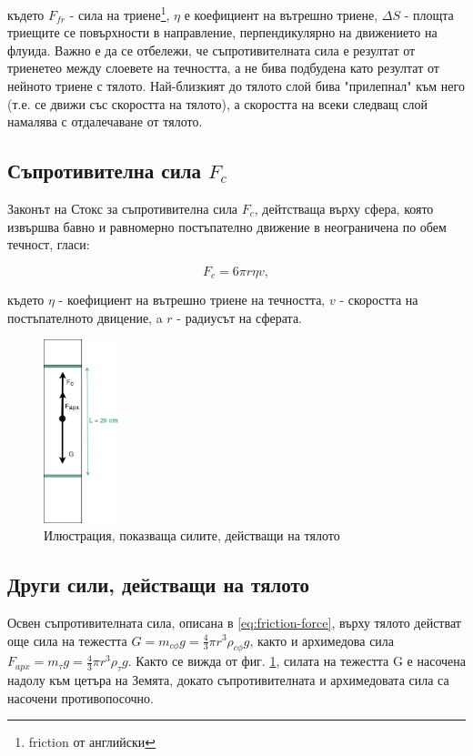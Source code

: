 \documentclass[12pt]{article}
\begin{document}
където $F_{fr}$ - сила на триене\footnote{friction от английски}, $\eta$ е коефициент на вътрешно триене, $\Delta S$ - площта триещите се повърхности в направление, перпендикулярно на движението на флуида.
Важно е да се отбележи, че съпротивителната сила е резултат от триенетео между слоевете на течността, а не бива подбудена като резултат от нейното триене с тялото. Най-близкият до тялото слой бива "прилепнал" към него (т.е. се движи със скоростта на тялото), а скоростта на всеки следващ слой намалява с отдалечаване от тялото.

\subsection{Съпротивителна сила $F_c$}
Законът на Стокс за съпротивителна сила $F_c$, дейтстваща върху сфера, която извършва бавно и равномерно постъпателно движение в неограничена по обем течност, гласи:

\begin{equation}\label{eq:friction-force}
    F_c = 6\pi r \eta v,
\end{equation}

където $\eta$ - коефициент на вътрешно триене на течността, $v$ - скоростта на постъпателното двицение, a $r$ - радиусът на сферата. 

\begin{figure}
    \centering
    \includegraphics[width=0.2\textwidth]{images/Stocks_Equations_2.drawio.png}
    \caption{Илюстрация, показваща силите, действащи на тялото}
    \label{fig:forces}
\end{figure}

\subsection{Други сили, действащи на тялото}
Освен съпротивителната сила, описана в \ref{eq:friction-force}, върху тялото действат още сила на тежестта $G = m_{c\phi}g = \frac{4}{3}\pi r^3 \rho_{c\phi} g$, както и архимедова сила $F_{apx} = m_\tau g = \frac{4}{3}\pi r^3 \rho_{\tau} g$. Както се вижда от фиг. \ref{fig:forces}, силата на тежестта G е насочена надолу към цетъра на Земята, докато съпротивителната и архимедовата сила са насочени противопосочно. 
\end{document}
